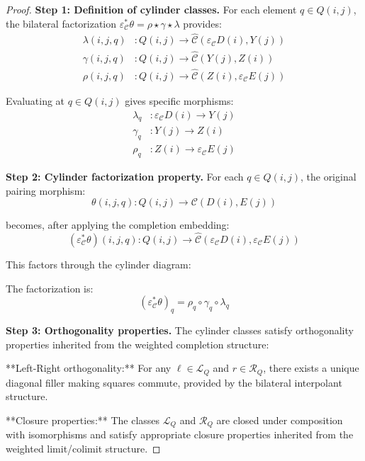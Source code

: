 \documentclass[11pt]{article}
\theoremstyle{plain}
\theoremstyle{definition}
\theoremstyle{remark}
\newcommand{\C}{\mathcal{C}}
\newcommand{\wh}[1]{\widehat{#1}}
\begin{document}
\begin{proof}
\textbf{Step 1: Definition of cylinder classes.}
For each element $q \in Q(i, j)$, the bilateral factorization $\varepsilon_\C^* \theta = \rho \star \gamma \star \lambda$ provides:
\begin{align}
\lambda(i, j, q) &: Q(i, j) \to \wh{\C}(\varepsilon_\C D(i), Y(j)) \\
\gamma(i, j, q) &: Q(i, j) \to \wh{\C}(Y(j), Z(i)) \\
\rho(i, j, q) &: Q(i, j) \to \wh{\C}(Z(i), \varepsilon_\C E(j))
\end{align}

Evaluating at $q \in Q(i, j)$ gives specific morphisms:
\begin{align}
\lambda_q &: \varepsilon_\C D(i) \to Y(j) \\
\gamma_q &: Y(j) \to Z(i) \\
\rho_q &: Z(i) \to \varepsilon_\C E(j)
\end{align}

\textbf{Step 2: Cylinder factorization property.}
For each $q \in Q(i, j)$, the original pairing morphism:
$$\theta(i, j, q) : Q(i, j) \to \C(D(i), E(j))$$

becomes, after applying the completion embedding:
$$(\varepsilon_\C^* \theta)(i, j, q) : Q(i, j) \to \wh{\C}(\varepsilon_\C D(i), \varepsilon_\C E(j))$$

This factors through the cylinder diagram:
\begin{center}
\end{center}

The factorization is:
$$(\varepsilon_\C^* \theta)_q = \rho_q \circ \gamma_q \circ \lambda_q$$

\textbf{Step 3: Orthogonality properties.}
The cylinder classes satisfy orthogonality properties inherited from the weighted completion structure:

**Left-Right orthogonality:** For any $\ell \in \mathcal{L}_Q$ and $r \in \mathcal{R}_Q$, there exists a unique diagonal filler making squares commute, provided by the bilateral interpolant structure.

**Closure properties:** The classes $\mathcal{L}_Q$ and $\mathcal{R}_Q$ are closed under composition with isomorphisms and satisfy appropriate closure properties inherited from the weighted limit/colimit structure.


\end{proof}
\end{document}

